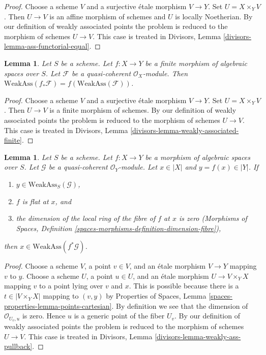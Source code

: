 \documentclass{stacks-project}
\theoremstyle{plain}
\newtheorem{lemma}[subsection]{Lemma}
\theoremstyle{definition}
\theoremstyle{remark}
\numberwithin{equation}{subsection}
\begin{document}
\begin{proof}
Choose a scheme $V$ and a surjective \'etale morphism $V \to Y$.
Set $U = X \times_Y V$. Then $U \to V$ is an affine morphism
of schemes and $U$ is locally Noetherian.
By our definition of weakly associated points
the problem is reduced to the morphism of schemes $U \to V$. This case is
treated in Divisors, Lemma \ref{divisors-lemma-ass-functorial-equal}.
\end{proof}

\begin{lemma}
\label{lemma-weakly-associated-finite}
Let $S$ be a scheme.
Let $f : X \to Y$ be a finite morphism of algebraic spaces over $S$.
Let $\mathcal{F}$ be a quasi-coherent $\mathcal{O}_X$-module.
Then $\text{WeakAss}(f_*\mathcal{F}) = f(\text{WeakAss}(\mathcal{F}))$.
\end{lemma}

\begin{proof}
Choose a scheme $V$ and a surjective \'etale morphism $V \to Y$.
Set $U = X \times_Y V$. Then $U \to V$ is a finite morphism
of schemes. By our definition of weakly associated points
the problem is reduced to the morphism of schemes $U \to V$. This case is
treated in Divisors, Lemma \ref{divisors-lemma-weakly-associated-finite}.
\end{proof}

\begin{lemma}
\label{lemma-weakly-ass-pullback}
Let $S$ be a scheme. Let $f : X \to Y$ be a morphism of algebraic spaces
over $S$. Let $\mathcal{G}$ be a quasi-coherent $\mathcal{O}_Y$-module.
Let $x \in |X|$ and $y = f(x) \in |Y|$. If
\begin{enumerate}
\item $y \in \text{WeakAss}_S(\mathcal{G})$,
\item $f$ is flat at $x$, and
\item the dimension of the local ring of the fibre of $f$ at $x$
is zero (Morphisms of Spaces, Definition
\ref{spaces-morphisms-definition-dimension-fibre}),
\end{enumerate}
then $x \in \text{WeakAss}(f^*\mathcal{G})$.
\end{lemma}

\begin{proof}
Choose a scheme $V$, a point $v \in V$, and an \'etale morphism $V \to Y$
mapping $v$ to $y$. Choose a scheme $U$, a point $u \in U$, and an
\'etale morphism $U \to V \times_Y X$ mapping $v$ to a point lying over
$v$ and $x$. This is possible because there is a $t \in |V \times_Y X|$
mapping to $(v, y)$ by Properties of Spaces, Lemma
\ref{spaces-properties-lemma-points-cartesian}.
By definition we see that the dimension of $\mathcal{O}_{U_v, u}$ is zero.
Hence $u$ is a generic point of the fiber $U_v$.
By our definition of weakly associated points
the problem is reduced to the morphism of schemes $U \to V$.
This case is treated in
Divisors, Lemma \ref{divisors-lemma-weakly-ass-pullback}.
\end{proof}
\end{document}
